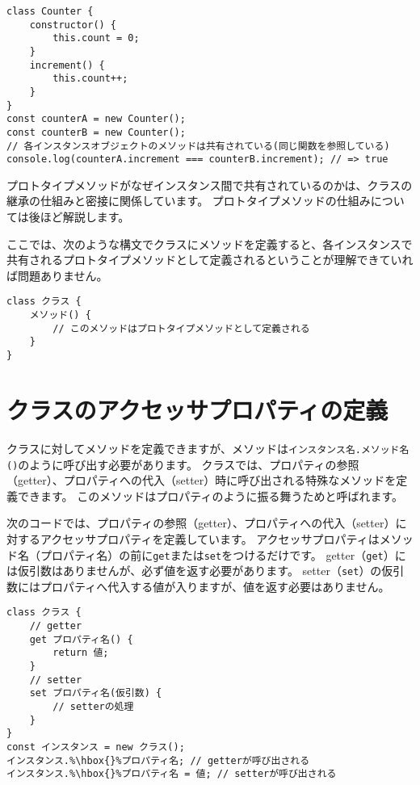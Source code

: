 \begin{lstlisting}
class Counter {
    constructor() {
        this.count = 0;
    }
    increment() {
        this.count++;
    }
}
const counterA = new Counter();
const counterB = new Counter();
// 各インスタンスオブジェクトのメソッドは共有されている(同じ関数を参照している)
console.log(counterA.increment === counterB.increment); // => true
\end{lstlisting}

プロトタイプメソッドがなぜインスタンス間で共有されているのかは、クラスの継承の仕組みと密接に関係しています。
プロトタイプメソッドの仕組みについては後ほど解説します。

ここでは、次のような構文でクラスにメソッドを定義すると、各インスタンスで共有されるプロトタイプメソッドとして定義されるということが理解できていれば問題ありません。

\enlargethispage{\baselineskip}\begin{lstlisting}
class クラス {
    メソッド() {
        // このメソッドはプロトタイプメソッドとして定義される
    }
}
\end{lstlisting}

\hypertarget{class-accessor-property}{%
\section{クラスのアクセッサプロパティの定義}\label{class-accessor-property}}

クラスに対してメソッドを定義できますが、メソッドは\texttt{インスタンス名.メソッド名()}のように呼び出す必要があります。
クラスでは、プロパティの参照（getter）、プロパティへの代入（setter）時に呼び出される特殊なメソッドを定義できます。
このメソッドはプロパティのように振る舞うため\textbf{}と呼ばれます。

次のコードでは、プロパティの参照（getter）、プロパティへの代入（setter）に対するアクセッサプロパティを定義しています。
アクセッサプロパティはメソッド名（プロパティ名）の前に\texttt{get}または\texttt{set}をつけるだけです。
getter（\texttt{get}）には仮引数はありませんが、必ず値を返す必要があります。
setter（\texttt{set}）の仮引数にはプロパティへ代入する値が入りますが、値を返す必要はありません。

\begin{lstlisting}[escapechar=\%]
class クラス {
    // getter
    get プロパティ名() {
        return 値;
    }
    // setter
    set プロパティ名(仮引数) {
        // setterの処理
    }
}
const インスタンス = new クラス();
インスタンス.%\hbox{}%プロパティ名; // getterが呼び出される
インスタンス.%\hbox{}%プロパティ名 = 値; // setterが呼び出される
\end{lstlisting}

